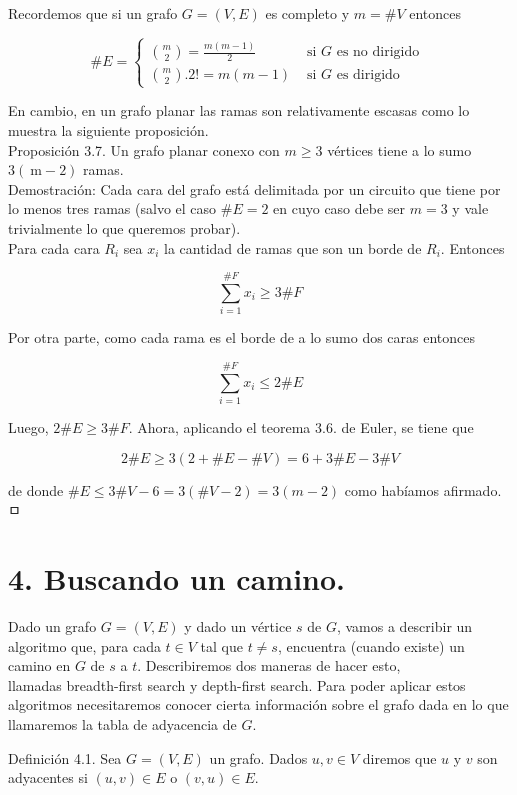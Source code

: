 \documentclass[10pt]{article}
\begin{document}
Recordemos que si un grafo $G=(V, E)$ es completo y $m=\# V$ entonces

$$
\# E= \begin{cases}\binom{m}{2}=\frac{m(m-1)}{2} & \text { si } G \text { es no dirigido } \\ \binom{m}{2} .2!=m(m-1) & \text { si } G \text { es dirigido }\end{cases}
$$

En cambio, en un grafo planar las ramas son relativamente escasas como lo muestra la siguiente proposición.\\
Proposición 3.7. Un grafo planar conexo con $m \geq 3$ vértices tiene a lo sumo $3(\mathrm{~m}-2)$ ramas.\\
Demostración: Cada cara del grafo está delimitada por un circuito que tiene por lo menos tres ramas (salvo el caso $\# E=2$ en cuyo caso debe ser $m=3$ y vale trivialmente lo que queremos probar).\\
Para cada cara $R_{i}$ sea $x_{i}$ la cantidad de ramas que son un borde de $R_{i}$. Entonces

$$
\sum_{i=1}^{\# F} x_{i} \geq 3 \# F
$$

Por otra parte, como cada rama es el borde de a lo sumo dos caras entonces

$$
\sum_{i=1}^{\# F} x_{i} \leq 2 \# E
$$

Luego, $2 \# E \geq 3 \# F$. Ahora, aplicando el teorema 3.6. de Euler, se tiene que

$$
2 \# E \geq 3(2+\# E-\# V)=6+3 \# E-3 \# V
$$

de donde $\# E \leq 3 \# V-6=3(\# V-2)=3(m-2)$ como habíamos afirmado. ㅁ

\section*{4. Buscando un camino.}
Dado un grafo $G=(V, E)$ y dado un vértice $s$ de $G$, vamos a describir un algoritmo que, para cada $t \in V$ tal que $t \neq s$, encuentra (cuando existe) un camino en $G$ de $s$ a $t$. Describiremos dos maneras de hacer esto,\\
llamadas breadth-first search y depth-first search. Para poder aplicar estos algoritmos necesitaremos conocer cierta información sobre el grafo dada en lo que llamaremos la tabla de adyacencia de $G$.

Definición 4.1. Sea $G=(V, E)$ un grafo. Dados $u, v \in V$ diremos que $u$ y $v$ son adyacentes si $(u, v) \in E$ o $(v, u) \in E$.
\end{document}
